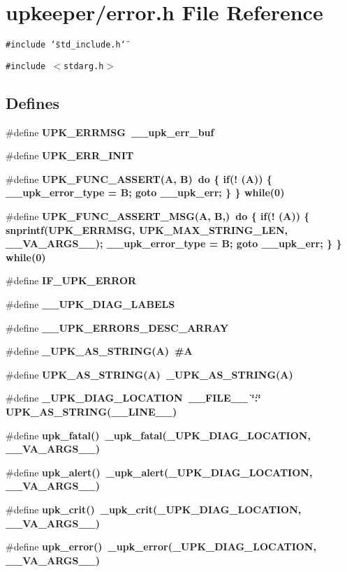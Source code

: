\section{upkeeper/error.h File Reference}
\label{error_8h}
{\tt \#include \char`\"{}std\_\-include.h\char`\"{}}\par
{\tt \#include $<$stdarg.h$>$}\par
\subsection*{Defines}
\begin{CompactItemize}
\item 
\#define \bf{UPK\_\-ERRMSG}~\_\-\_\-upk\_\-err\_\-buf
\item 
\#define \bf{UPK\_\-ERR\_\-INIT}
\item 
\#define \bf{UPK\_\-FUNC\_\-ASSERT}(A, B)~do \{ if(! (A)) \{ \_\-\_\-upk\_\-error\_\-type = B; goto \_\-\_\-upk\_\-err; \} \} while(0)
\item 
\#define \bf{UPK\_\-FUNC\_\-ASSERT\_\-MSG}(A, B,)~do \{ if(! (A)) \{ snprintf(UPK\_\-ERRMSG, UPK\_\-MAX\_\-STRING\_\-LEN, \_\-\_\-VA\_\-ARGS\_\-\_\-); \_\-\_\-upk\_\-error\_\-type = B; goto \_\-\_\-upk\_\-err; \} \} while(0)
\item 
\#define \bf{IF\_\-UPK\_\-ERROR}
\item 
\#define \bf{\_\-\_\-UPK\_\-DIAG\_\-LABELS}
\item 
\#define \bf{\_\-\_\-UPK\_\-ERRORS\_\-DESC\_\-ARRAY}
\item 
\#define \bf{\_\-UPK\_\-AS\_\-STRING}(A)~\#A
\item 
\#define \bf{UPK\_\-AS\_\-STRING}(A)~\_\-UPK\_\-AS\_\-STRING(A)
\item 
\#define \bf{\_\-UPK\_\-DIAG\_\-LOCATION}~\_\-\_\-FILE\_\-\_\- \char`\"{}:\char`\"{} UPK\_\-AS\_\-STRING(\_\-\_\-LINE\_\-\_\-)
\item 
\#define \bf{upk\_\-fatal}()~\_\-upk\_\-fatal(\_\-UPK\_\-DIAG\_\-LOCATION, \_\-\_\-VA\_\-ARGS\_\-\_\-)
\item 
\#define \bf{upk\_\-alert}()~\_\-upk\_\-alert(\_\-UPK\_\-DIAG\_\-LOCATION, \_\-\_\-VA\_\-ARGS\_\-\_\-)
\item 
\#define \bf{upk\_\-crit}()~\_\-upk\_\-crit(\_\-UPK\_\-DIAG\_\-LOCATION, \_\-\_\-VA\_\-ARGS\_\-\_\-)
\item 
\#define \bf{upk\_\-error}()~\_\-upk\_\-error(\_\-UPK\_\-DIAG\_\-LOCATION, \_\-\_\-VA\_\-ARGS\_\-\_\-)
\item 

\end{CompactItemize}
